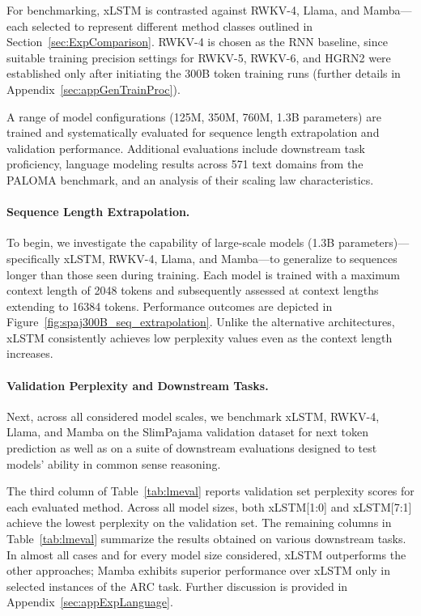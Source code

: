 For benchmarking, xLSTM is contrasted against RWKV-4, Llama, and Mamba—each selected to represent different method classes outlined in Section~\ref{sec:ExpComparison}. RWKV-4 is chosen as the RNN baseline, since suitable training precision settings for RWKV-5, RWKV-6, and HGRN2 were established only after initiating the 300B token training runs (further details in Appendix~\ref{sec:appGenTrainProc}).

A range of model configurations (125M, 350M, 760M, 1.3B parameters) are trained and systematically evaluated for sequence length extrapolation and validation performance. Additional evaluations include downstream task proficiency, language modeling results across 571 text domains from the PALOMA benchmark, and an analysis of their scaling law characteristics.

\paragraph{Sequence Length Extrapolation.}
\label{sec:spaj300B_ctx_extrapolation}
To begin, we investigate the capability of large-scale models (1.3B parameters)---specifically xLSTM, RWKV-4, Llama, and Mamba---to generalize to sequences longer than those seen during training. Each model is trained with a maximum context length of 2048 tokens and subsequently assessed at context lengths extending to 16384 tokens. Performance outcomes are depicted in Figure~\ref{fig:spaj300B_seq_extrapolation}. Unlike the alternative architectures, xLSTM consistently achieves low perplexity values even as the context length increases.

\paragraph{Validation Perplexity and Downstream Tasks.}
\label{sec:spaj_downstream_eval}
Next, across all considered model scales, we benchmark xLSTM, RWKV-4, Llama, and Mamba on the SlimPajama validation dataset for next token prediction as well as on a suite of downstream evaluations designed to test models’ ability in common sense reasoning.

The third column of Table~\ref{tab:lmeval} reports validation set perplexity scores for each evaluated method. Across all model sizes, both xLSTM[1:0] and xLSTM[7:1] achieve the lowest perplexity on the validation set. The remaining columns in Table~\ref{tab:lmeval} summarize the results obtained on various downstream tasks. In almost all cases and for every model size considered, xLSTM outperforms the other approaches; Mamba exhibits superior performance over xLSTM only in selected instances of the ARC task. Further discussion is provided in Appendix~\ref{sec:appExpLanguage}.

